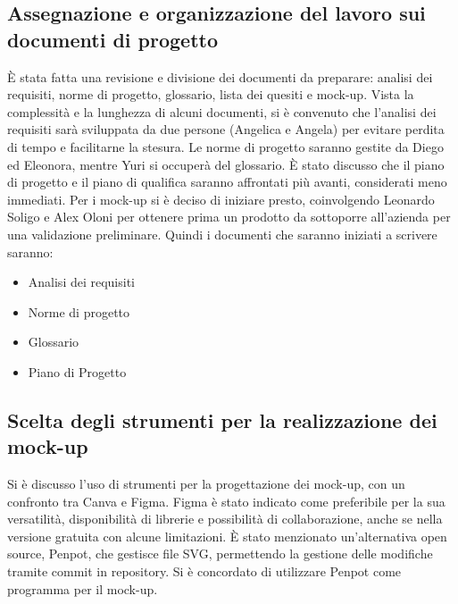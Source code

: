 \documentclass[a4paper,12pt]{article}
\begin{document}
\subsection{Assegnazione e organizzazione del lavoro sui documenti di progetto}
È stata fatta una revisione e divisione dei documenti da preparare: 
analisi dei requisiti, norme di progetto, glossario, lista dei quesiti e mock-up. Vista la complessità e la lunghezza di alcuni documenti, 
si è convenuto che l'analisi dei requisiti sarà sviluppata da due persone (Angelica e Angela) per evitare perdita di tempo e facilitarne la stesura. 
Le norme di progetto saranno gestite da Diego ed Eleonora, mentre Yuri si occuperà del glossario. 
È stato discusso che il piano di progetto e il piano di qualifica saranno affrontati più avanti, considerati meno immediati. 
Per i mock-up si è deciso di iniziare presto, coinvolgendo Leonardo Soligo e Alex Oloni per ottenere prima un prodotto da sottoporre all'azienda per una validazione preliminare.
Quindi i documenti che saranno iniziati a scrivere saranno:
\begin{itemize}
    \item Analisi dei requisiti
    \item Norme di progetto
    \item Glossario
    \item Piano di Progetto
\end{itemize}

\subsection{Scelta degli strumenti per la realizzazione dei mock-up}
Si è discusso l'uso di strumenti per la progettazione dei mock-up, con un confronto tra Canva e Figma. 
Figma è stato indicato come preferibile per la sua versatilità, disponibilità di librerie e possibilità di collaborazione, 
anche se nella versione gratuita con alcune limitazioni. 
È stato menzionato un'alternativa open source, Penpot, che gestisce file SVG, permettendo la gestione delle modifiche tramite commit in repository. 
Si è concordato di utilizzare Penpot come programma per il mock-up.
\end{document}
